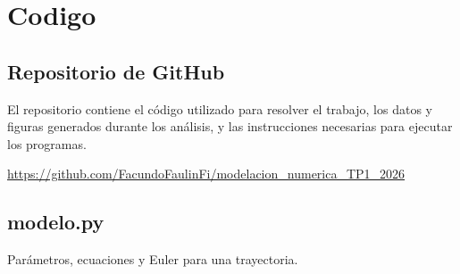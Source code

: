 \section{Codigo}

\subsection{Repositorio de GitHub}

El repositorio contiene el código utilizado para resolver el trabajo,
los datos y figuras generados durante los análisis, y las instrucciones
necesarias para ejecutar los programas.

\url{https://github.com/FacundoFaulinFi/modelacion_numerica_TP1_2026}



\subsection{modelo.py}
Parámetros, ecuaciones y Euler para una trayectoria.
